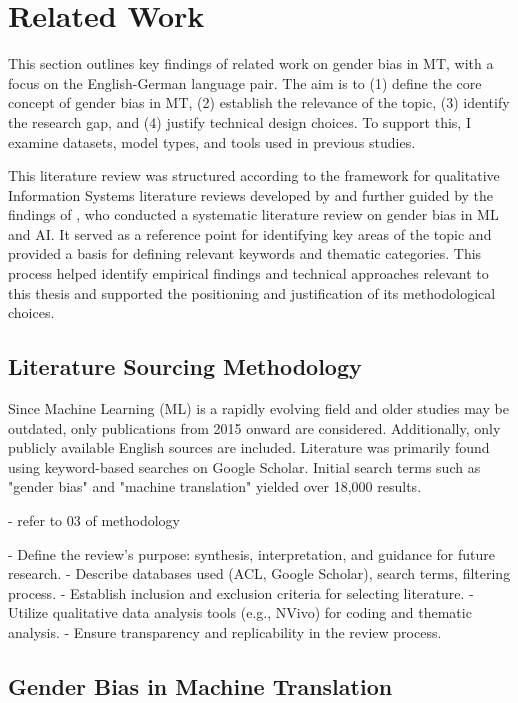 \chapter{Related Work}

This section outlines key findings of related work on gender bias in MT, with a focus on the English-German language pair. The aim is to (1) define the core concept of gender bias in MT, (2) establish the relevance of the topic, (3) identify the research gap, and (4) justify technical design choices. To support this, I examine datasets, model types, and tools used in previous studies.

This literature review was structured according to the framework for qualitative Information Systems literature reviews developed by \citet{smacchiaDoesAIReflect2024} and further guided by the findings of \citet{shresthaExploringGenderBiases2022}, who conducted a systematic literature review on gender bias in ML and AI. It served as a reference point for identifying key areas of the topic and provided a basis for defining relevant keywords and thematic categories. This process helped identify empirical findings and technical approaches relevant to this thesis and supported the positioning and justification of its methodological choices.


\section{Literature Sourcing Methodology}



Since Machine Learning (ML) is a rapidly evolving field and older studies may be outdated, only
publications from 2015 onward are considered. Additionally, only publicly available English sources
are included. Literature was primarily found using keyword-based searches on Google Scholar. Initial
search terms such as "gender bias" and "machine translation" yielded over 18,000 results. 

- refer to 03 of methodology

- Define the review's purpose: synthesis, interpretation, and guidance for future research.
- Describe databases used (ACL, Google Scholar), search terms, filtering process.
- Establish inclusion and exclusion criteria for selecting literature.
- Utilize qualitative data analysis tools (e.g., NVivo) for coding and thematic analysis.
- Ensure transparency and replicability in the review process.

\section{Gender Bias in Machine Translation}

